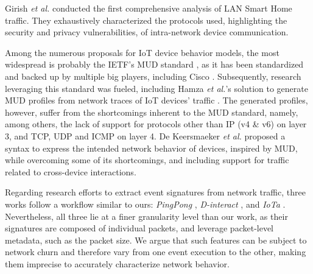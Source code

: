 Girish \textit{et al.} \cite{in-the-room} conducted the first comprehensive analysis
of LAN Smart Home traffic.
They exhaustively characterized the protocols used,
highlighting the security and privacy vulnerabilities,
of intra-network device communication.

Among the numerous proposals for IoT device behavior models,
the most widespread is probably the IETF's MUD standard \cite{mud},
as it has been standardized and backed up by multiple big players,
including Cisco \cite{mud-cisco}.
Subsequently, research leveraging this standard was fueled,
including Hamza \textit{et al.}'s solution to
generate MUD profiles from network traces of IoT devices' traffic \cite{hamza_clear_2018}.
The generated profiles, however, suffer from the shortcomings inherent to the MUD standard,
namely, among others, the lack of support for protocols other than
IP (v4 \& v6) on layer 3,
and TCP, UDP and ICMP on layer 4.
De Keersmaeker \textit{et al.} \cite{smart-home-firewall} proposed a syntax
to express the intended network behavior of devices,
inspired by MUD,
while overcoming some of its shortcomings,
and including support for traffic related to cross-device interactions.

Regarding research efforts to extract event signatures from network traffic,
three works follow a workflow similar to ours:
\emph{PingPong} \cite{ping-pong},
\emph{D-interact} \cite{sun_inferring_2022},
and \emph{IoTa} \cite{duan_iota_2023}.
Nevertheless, all three lie at a finer granularity level than our work,
as their signatures are composed of individual packets,
and leverage packet-level metadata,
such as the packet size.
We argue that such features can be subject to network churn
and therefore vary from one event execution to the other,
making them imprecise to accurately characterize network behavior.



